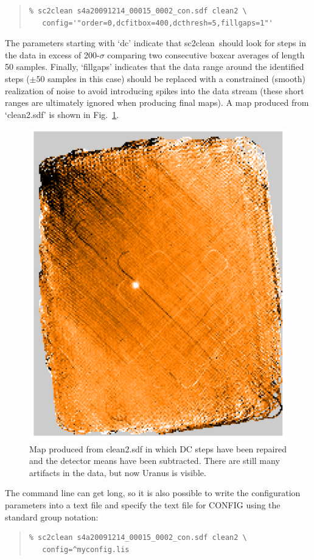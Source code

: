 \documentclass[twoside,11pt]{article}
\newcommand{\xref}[3]{#1}
\renewcommand{\_}{\texttt{\symbol{95}}}
\newenvironment{myquote}{\begin{quote}\begin{small}}{\end{small}\end{quote}}
\newcommand{\task}[1]{\textsf{#1}}
\newcommand{\clean}{\xref{\task{sc2clean}}{sun258}{SC2CLEAN}}
\begin{document}
\begin{myquote}
\begin{verbatim}
% sc2clean s4a20091214_00015_0002_con.sdf clean2 \
   config='"order=0,dcfitbox=400,dcthresh=5,fillgaps=1"'
\end{verbatim}
\end{myquote}

The parameters starting with `dc' indicate that \clean\ should look
for steps in the data in excess of 200-$\sigma$ comparing two
consecutive boxcar averages of length 50 samples.  Finally,
`fillgaps' indicates that the data range around the identified steps
($\pm 50$ samples in this case) should be replaced with a constrained
(smooth) realization of noise to avoid introducing spikes into the
data stream (these short ranges are ultimately ignored when producing
final maps). A map produced from `clean2.sdf' is shown in
Fig.~\ref{fig:map_dc_mean}.

\begin{figure}
\begin{center}
\includegraphics[width=0.5\linewidth]{sc19_map_mean_dc}
\caption{Map produced from clean2.sdf in which DC steps have been
  repaired and the detector means have been subtracted. There are
  still many artifacts in the data, but now Uranus is visible.}
\label{fig:map_dc_mean}
\end{center}
\end{figure}

The command line can get long, so it is also possible to write the
configuration parameters into a text file and specify the text file
for CONFIG using the standard group notation:

\begin{myquote}
\begin{verbatim}
% sc2clean s4a20091214_00015_0002_con.sdf clean2 \
   config=^myconfig.lis
\end{verbatim}
\end{myquote}
\end{document}
